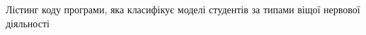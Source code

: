 \append{}
Лістинг коду програми, яка класифікує моделі студентів за типами віщої нервової
діяльності
\lstset{inputencoding=utf8, extendedchars=\true}

